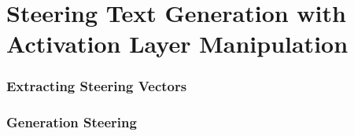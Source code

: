 \section{Steering Text Generation with Activation Layer Manipulation}
\label{sec:approach:steering:actAdd}

\subsubsection{Extracting Steering Vectors}

\subsubsection{Generation Steering}